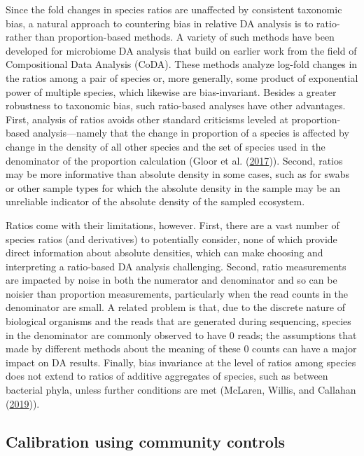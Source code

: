 \documentclass[
]{article}
\begin{document}
Since the fold changes in species ratios are unaffected by consistent taxonomic bias, a natural approach to countering bias in relative DA analysis is to ratio- rather than proportion-based methods.
A variety of such methods have been developed for microbiome DA analysis that build on earlier work from the field of Compositional Data Analysis (CoDA).
These methods analyze log-fold changes in the ratios among a pair of species or, more generally, some product of exponential power of multiple species, which likewise are bias-invariant.
Besides a greater robustness to taxonomic bias, such ratio-based analyses have other advantages.
First, analysis of ratios avoids other standard criticisms leveled at proportion-based analysis---namely that the change in proportion of a species is affected by change in the density of all other species and the set of species used in the denominator of the proportion calculation (Gloor et al. (\protect\hyperlink{ref-gloor2017micr}{2017})).
Second, ratios may be more informative than absolute density in some cases, such as for swabs or other sample types for which the absolute density in the sample may be an unreliable indicator of the absolute density of the sampled ecosystem.

Ratios come with their limitations, however.
First, there are a vast number of species ratios (and derivatives) to potentially consider, none of which provide direct information about absolute densities, which can make choosing and interpreting a ratio-based DA analysis challenging.
Second, ratio measurements are impacted by noise in both the numerator and denominator and so can be noisier than proportion measurements, particularly when the read counts in the denominator are small.
A related problem is that, due to the discrete nature of biological organisms and the reads that are generated during sequencing, species in the denominator are commonly observed to have 0 reads; the assumptions that made by different methods about the meaning of these 0 counts can have a major impact on DA results.
Finally, bias invariance at the level of ratios among species does not extend to ratios of additive aggregates of species, such as between bacterial phyla, unless further conditions are met (McLaren, Willis, and Callahan (\protect\hyperlink{ref-mclaren2019cons}{2019})).

\hypertarget{calibrate-compositions}{%
\subsection{Calibration using community controls}\label{calibrate-compositions}}
\end{document}
